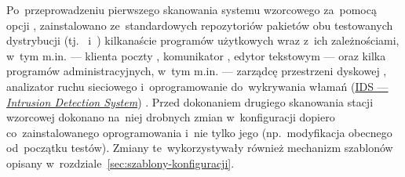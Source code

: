 \documentclass[thesis]{subfiles}
\begin{document}
Po~przeprowadzeniu pierwszego skanowania systemu wzorcowego za~pomocą opcji , zainstalowano ze~standardowych repozytoriów pakietów obu testowanych dystrybucji (tj.~\debian{} i~\linuxarch{}) kilkanaście programów użytkowych wraz z~ich zależnościami, w~tym m.in. --- klienta poczty , komunikator , edytor tekstowym  --- oraz kilka programów administracyjnych, w~tym m.in. --- zarządcę przestrzeni dyskowej , analizator ruchu sieciowego  i~oprogramowanie do~wykrywania włamań (\href{https://en.wikipedia.org/wiki/Intrusion_detection_system}{IDS --- \emph{Intrusion Detection System}}) . Przed dokonaniem drugiego skanowania stacji wzorcowej dokonano na~niej drobnych zmian w~konfiguracji dopiero co~zainstalowanego oprogramowania i~nie tylko jego (np.~modyfikacja  obecnego od~początku testów). Zmiany te~wykorzystywały również mechanizm szablonów opisany w~rozdziale~\ref{sec:szablony-konfiguracji}.
\end{document}
